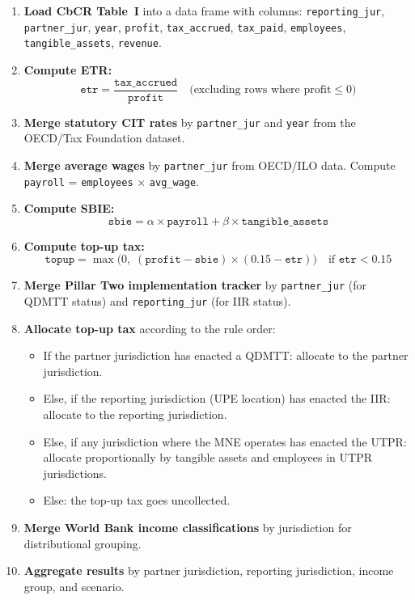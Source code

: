 \documentclass[12pt,a4paper]{article}
\begin{document}
\begin{enumerate}
\item \textbf{Load CbCR Table~I} into a data frame with columns: \texttt{reporting\_jur}, \texttt{partner\_jur}, \texttt{year}, \texttt{profit}, \texttt{tax\_accrued}, \texttt{tax\_paid}, \texttt{employees}, \texttt{tangible\_assets}, \texttt{revenue}.

\item \textbf{Compute ETR:}
\[
\texttt{etr} = \frac{\texttt{tax\_accrued}}{\texttt{profit}} \quad \text{(excluding rows where profit} \leq 0\text{)}
\]

\item \textbf{Merge statutory CIT rates} by \texttt{partner\_jur} and \texttt{year} from the OECD/Tax Foundation dataset.

\item \textbf{Merge average wages} by \texttt{partner\_jur} from OECD/ILO data.
Compute \texttt{payroll} = \texttt{employees} $\times$ \texttt{avg\_wage}.

\item \textbf{Compute SBIE:}
\[
\texttt{sbie} = \alpha \times \texttt{payroll} + \beta \times \texttt{tangible\_assets}
\]

\item \textbf{Compute top-up tax:}
\[
\texttt{topup} = \max\bigl(0,\; (\texttt{profit} - \texttt{sbie}) \times (0.15 - \texttt{etr})\bigr) \quad \text{if } \texttt{etr} < 0.15
\]

\item \textbf{Merge Pillar Two implementation tracker} by \texttt{partner\_jur} (for QDMTT status) and \texttt{reporting\_jur} (for IIR status).

\item \textbf{Allocate top-up tax} according to the rule order:
\begin{itemize}
    \item If the partner jurisdiction has enacted a QDMTT: allocate to the partner jurisdiction.
    \item Else, if the reporting jurisdiction (UPE location) has enacted the IIR: allocate to the reporting jurisdiction.
    \item Else, if any jurisdiction where the MNE operates has enacted the UTPR: allocate proportionally by tangible assets and employees in UTPR jurisdictions.
    \item Else: the top-up tax goes uncollected.
\end{itemize}

\item \textbf{Merge World Bank income classifications} by jurisdiction for distributional grouping.

\item \textbf{Aggregate results} by partner jurisdiction, reporting jurisdiction, income group, and scenario.
\end{enumerate}
\end{document}

